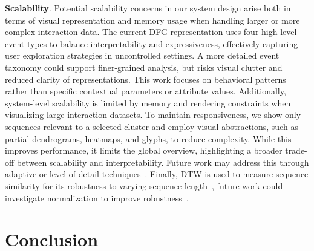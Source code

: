 \documentclass[preprint,journal]{vgtc}            %
\begin{document}
\noindent
\textbf{Scalability}.
Potential scalability concerns in our system design arise both in terms of visual representation and memory usage when handling larger or more complex interaction data.
The current DFG representation uses four high-level event types to balance interpretability and expressiveness, effectively capturing user exploration strategies in uncontrolled settings.
A more detailed event taxonomy could support finer-grained analysis, but risks visual clutter and reduced clarity of representations.
This work focuses on behavioral patterns rather than specific contextual parameters or attribute values.
Additionally, system-level scalability is limited by memory and rendering constraints when visualizing large interaction datasets.
To maintain responsiveness, we show only sequences relevant to a selected cluster and employ visual abstractions, such as partial dendrograms, heatmaps, and glyphs, to reduce complexity. 
While this improves performance, it limits the global overview, highlighting a broader trade-off between scalability and interpretability. 
Future work may address this through adaptive or level-of-detail techniques~\cite{Yanez25The}.
Finally, DTW is used to measure sequence similarity for its robustness to varying sequence length~\cite{Chotirat05Three}, future work could investigate normalization to improve robustness~\cite{Kraprayoon24Improving}.












\section{Conclusion}
\end{document}
